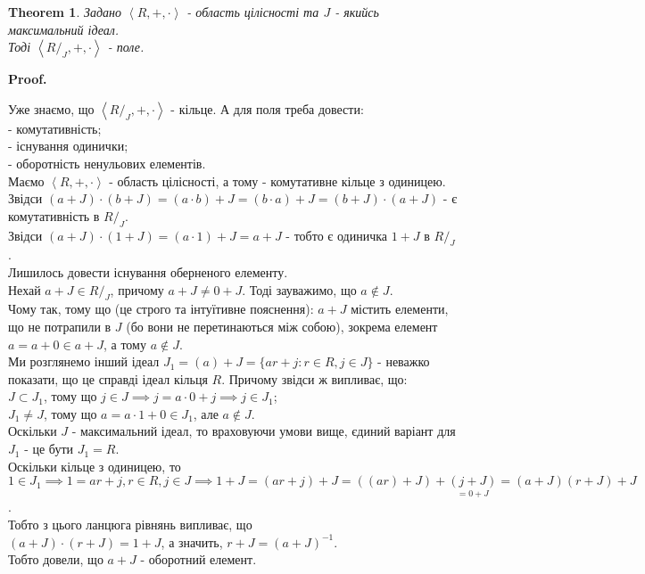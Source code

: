 \documentclass[a4paper, 10pt]{article}
\makeatletter
\theoremstyle{theoremdd}
\newtheorem{theorem}{Theorem}[subsection]
\theoremstyle{theoremdd}
\theoremstyle{theoremdd}
\theoremstyle{theoremdd}
\theoremstyle{theoremdd}
\theoremstyle{theoremdd}
\theoremstyle{theoremdd}
\theoremstyle{theoremdd}
\theoremstyle{theoremdd}
\theoremstyle{theoremdd}
\theoremstyle{theoremdd}
\theoremstyle{theoremdd}
\theoremstyle{theoremdd}
\theoremstyle{theoremdd}
\theoremstyle{theoremdd}
\renewenvironment{proof}[1][Proof.\\]{\par
\pushQED{\hfill \qed}%
\normalfont \topsep6\p@\@plus6\p@\relax
\trivlist
\item\relax
{\bfseries
#1\@addpunct{.}}\hspace\labelsep\ignorespaces
}{%
\popQED\endtrivlist\@endpefalse
}
\makeatother
\begin{document}
\begin{theorem}
Задано $\left<R,+,\cdot \right>$ - область цілісності та $J$ - якийсь максимальний ідеал.\\
Тоді $\left<R/_J, +, \cdot \right>$ - поле.
\end{theorem}

\begin{proof}
Уже знаємо, що $\left<R/_J, +, \cdot \right>$ - кільце. А для поля треба довести:\\
- комутативність;\\
- існування одинички;\\
- оборотність ненульових елементів.\\
Маємо $\left<R,+,\cdot \right>$ - область цілісності, а тому - комутативне кільце з одиницею.\\
Звідси $(a+J) \cdot (b+J) = (a \cdot b) + J = (b \cdot a) + J = (b+J) \cdot (a+J)$ - є комутативність в $R/_J$.\\
Звідси $(a+J) \cdot (1+J) = (a \cdot 1) + J = a + J$ - тобто є одиничка $1+J$ в $R/_J$.\\
Лишилось довести існування оберненого елементу.\\
Нехай $a+J \in R/_J$, причому $a+J \neq 0+J$. Тоді зауважимо, що $a \not\in J$.\\
\iffalse %
!Припустимо, що $a \in J$. Тоді\\
$b \in J \implies b = a + \underset{\in J}{(b-a)} \implies b \in a+J$\\
$b \in a+J \implies b = \underset{\in J}{a}+\underset{\in J}{j} \implies b \in J$.\\
Тобто звідси $a+J = J$. Суперечність! А тому $a \not \in J$.
\fi
Чому так, тому що (це строго та інтуїтивне пояснення): $a+J$ містить елементи, що не потрапили в $J$ (бо вони не перетинаються між собою), зокрема елемент $a = a+0 \in a+J$, а тому $a \not\in J$.
\bigskip \\
Ми розглянемо інший ідеал $J_1 = (a) + J = \{ar+j: r \in R, j \in J\}$ - неважко показати, що це справді ідеал кільця $R$. Причому звідси ж випливає, що: \\
$J \subset J_1$, тому що $j \in J \implies j = a \cdot 0 + j \implies j \in J_1$;\\
$J_1 \neq J$, тому що $a = a \cdot 1 + 0 \in J_1$, але $a \not\in J$.\\
Оскільки $J$ - максимальний ідеал, то враховуючи умови вище, єдиний варіант для $J_1$ - це бути $J_1 = R$.\\
Оскільки кільце з одиницею, то $1 \in J_1 \implies 1 = ar+j, r \in R, j \in J \implies 1+J = (ar+j) + J = ((ar)+J) + \underset{= 0+J}{(j+J)} = (a+J)(r+J) +J$.\\
Тобто з цього ланцюга рівнянь випливає, що\\
$(a+J) \cdot (r+J) = 1+J$, а значить, $r+J = (a+J)^{-1}$.\\
Тобто довели, що $a+J$ - оборотний елемент.
\end{proof}
\fi
\end{document}
